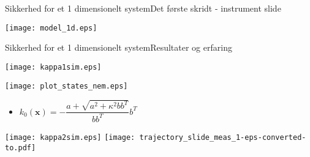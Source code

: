 \begin{frame}{Sikkerhed for et 1 dimensionelt system}{Det første skridt - instrument slide}
\begin{minipage}{0.35\textwidth}
\hspace*{-0.5cm}
\texttt{[image: model\_1d.eps]}

\end{minipage}
\end{frame}


\begin{frame}{Sikkerhed for et 1 dimensionelt system}{Resultater og erfaring}
\begin{minipage}{0.48\textwidth}
\vspace*{-0.2cm}
\texttt{[image: kappa1sim.eps]}

\vspace{0.3cm}

\texttt{[image: plot\_states\_nem.eps]}

\begin{itemize}
	\item \scriptsize $k_0(\textbf{x}) = -\dfrac{a + \sqrt{a^2 + \kappa^2 b b^T}}{b b^T} b^T$
\end{itemize}
\end{minipage}
\begin{minipage}{0.48\textwidth}
\texttt{[image: kappa2sim.eps]}
\vspace*{0.05cm}
\texttt{[image: trajectory\_slide\_meas\_1-eps-converted-to.pdf]}

\end{minipage}
\end{frame}

